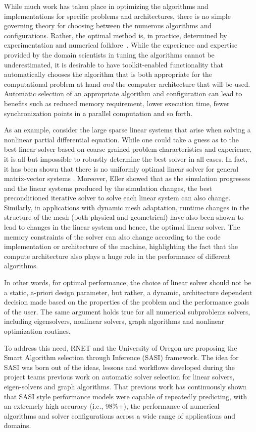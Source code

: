 While much work has taken place in optimizing the algorithms and implementations for specific problems and architectures, there is no simple governing theory for choosing between the numerous algorithms and configurations. Rather, the optimal method is, in practice, determined by experimentation and numerical folklore~\cite{EijkFuen2010:multistage}. While the experience and expertise provided by the domain scientists in tuning the algorithms cannot be underestimated, it is desirable to have toolkit-enabled functionality that automatically chooses the algorithm that is both appropriate for the computational problem at hand \emph{and} the computer architecture that will be used. Automatic selection of an appropriate algorithm and configuration can lead to benefits such as reduced memory requirement, lower execution time, fewer synchronization points in a parallel computation and so forth. 

As an example, consider the large sparse linear systems that arise when solving a nonlinear partial differential equation. While one could take a guess as to the best linear solver based on coarse grained problem characteristics and experience, it is all but impossible to robustly determine the best solver in all cases. In fact, it has been shown that there is no uniformly optimal linear solver for general matrix-vector systems \cite{TODO}. Moreover, Eller \cite{Eller2012} showed that as the simulation progresses and the linear systems produced by the simulation changes, the best preconditioned iterative solver to solve each linear system can also change. Similarly, in applications with dynamic mesh adaptation, runtime changes in the structure of the mesh (both physical and geometrical) have also been shown to lead to changes in the linear system and hence, the optimal linear solver. The memory constraints of the solver can also change according to the code implementation or architecture of the machine, highlighting the fact that the compute architecture also plays a huge role in the performance of different algorithms.

In other words, for optimal performance, the choice of linear solver should not be a static, a-priori design parameter, but rather, a dynamic, architecture dependent decision made based on the properties of the problem and the performance goals of the user. The same argument holds true for all numerical subproblems solvers, including eigensolvers, nonlinear solvers, graph algorithms and nonlinear optimization routines.      

To address this need, RNET and the University of Oregon are proposing the Smart Algorithm selection through Inference (SASI) framework. The idea for SASI was born out of the ideas, lessons and workflows developed during the project teams previous work on automatic solver selection for linear solvers, eigen-solvers and graph algorithms. That previous work has continuously shown that SASI style performance models were capable of repeatedly predicting, with an extremely high accuracy (i.e., 98\%+), the performance of numerical algorithms and solver configurations across a wide range of applications and domains.

